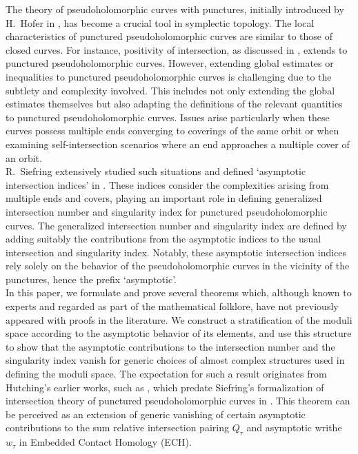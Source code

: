 \documentclass[11pt, a4paper]{amsart}
\begin{document}
The theory of pseudoholomorphic curves with punctures, initially introduced by H.~Hofer in \cite{Hofer_WeinsteinConjecture}, has become a crucial tool in symplectic topology. The local characteristics of punctured pseudoholomorphic curves are similar to those of closed curves. For instance, positivity of intersection, as discussed in \cite{McDuff_Positivity}, extends to punctured pseudoholomorphic curves. However, extending global estimates or inequalities to punctured pseudoholomorphic curves is challenging due to the subtlety and complexity involved. This includes not only extending the global estimates themselves but also adapting the definitions of the relevant quantities to punctured pseudoholomorphic curves. Issues arise particularly when these curves possess multiple ends converging to coverings of the same orbit or when examining self-intersection scenarios where an end approaches a multiple cover of an orbit.\\

R.~Siefring extensively studied such situations and defined `asymptotic intersection indices' in \cite{Siefinter2009}. These indices consider the complexities arising from multiple ends and covers, playing an important role in defining generalized intersection number and singularity index for punctured pseudoholomorphic curves. The generalized intersection number and singularity index are defined by adding suitably the contributions from the asymptotic indices to the usual intersection and singularity index. Notably, these asymptotic intersection indices rely solely on the behavior of the pseudoholomorphic curves in the vicinity of the punctures, hence the prefix `asymptotic'.\\

In this paper, we formulate and prove several theorems which, although known to experts and regarded as part of the mathematical folklore, have not previously appeared with proofs in the literature. We construct a stratification of the moduli space according to the asymptotic behavior of its elements, and use this structure to show that the asymptotic contributions to the intersection number and the singularity index vanish for generic choices of almost complex structures used in defining the moduli space. The expectation for such a result originates from Hutching's earlier works, such as \cite{Hutching_Indexinequality, Hutching_ECHindex}, which predate Siefring's formalization of intersection theory of punctured pseudoholomorphic curves in \cite{Siefinter2009}. This theorem can be perceived as an extension of generic vanishing of certain asymptotic contributions to the sum relative intersection pairing $Q_{\tau}$ and asymptotic writhe $w_{\tau}$ in Embedded Contact Homology (ECH).
\end{document}
